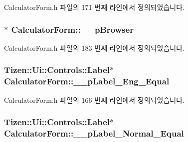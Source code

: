 Calculator\+Form.\+h 파일의 171 번째 라인에서 정의되었습니다.

\hypertarget{class_calculator_form_afc760fc5946b899bd2b0807157098a3e}{
\subsubsection[{\+\_\+\+\_\+p\+Browser}]{$\ast$ Calculator\+Form\+::\+\_\+\+\_\+p\+Browser\hspace{0.3cm}{\ttfamily [protected]}}}\label{class_calculator_form_afc760fc5946b899bd2b0807157098a3e}


Calculator\+Form.\+h 파일의 183 번째 라인에서 정의되었습니다.

\hypertarget{class_calculator_form_a57055baa16d93e319c193d01bf833bc7}{
\subsubsection[{\+\_\+\+\_\+p\+Label\+\_\+\+Eng\+\_\+\+Equal}]{\setlength{\rightskip}{0pt plus 5cm}Tizen\+::\+Ui\+::\+Controls\+::\+Label$\ast$ Calculator\+Form\+::\+\_\+\+\_\+p\+Label\+\_\+\+Eng\+\_\+\+Equal\hspace{0.3cm}{\ttfamily [protected]}}}\label{class_calculator_form_a57055baa16d93e319c193d01bf833bc7}


Calculator\+Form.\+h 파일의 166 번째 라인에서 정의되었습니다.

\hypertarget{class_calculator_form_ae9a8c51bc39c7ec66a7e43f6c29a14d8}{
\subsubsection[{\+\_\+\+\_\+p\+Label\+\_\+\+Normal\+\_\+\+Equal}]{\setlength{\rightskip}{0pt plus 5cm}Tizen\+::\+Ui\+::\+Controls\+::\+Label$\ast$ Calculator\+Form\+::\+\_\+\+\_\+p\+Label\+\_\+\+Normal\+\_\+\+Equal\hspace{0.3cm}{\ttfamily [protected]}}}\label{class_calculator_form_ae9a8c51bc39c7ec66a7e43f6c29a14d8}


